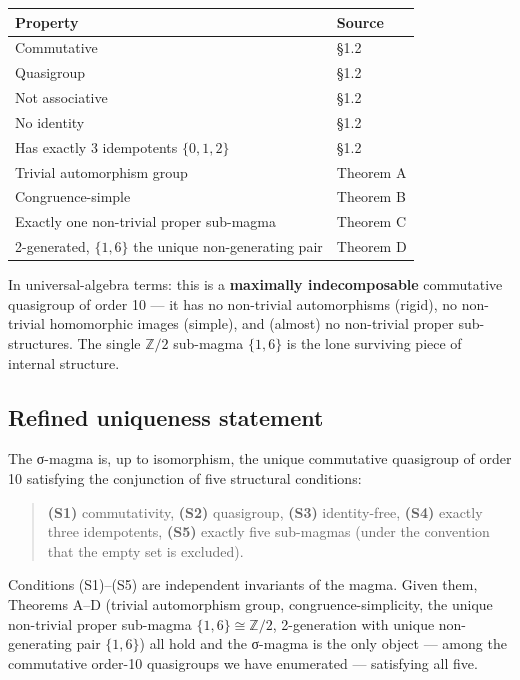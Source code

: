 \documentclass[11pt,reqno]{amsart}
\theoremstyle{plain}
\theoremstyle{definition}
\begin{document}
\begin{center}
\begin{tabular}{ll}
\toprule
Property & Source \\
\midrule
Commutative & §1.2 \\
Quasigroup & §1.2 \\
Not associative & §1.2 \\
No identity & §1.2 \\
Has exactly 3 idempotents $\{0, 1, 2\}$ & §1.2 \\
Trivial automorphism group & Theorem A \\
Congruence-simple & Theorem B \\
Exactly one non-trivial proper sub-magma & Theorem C \\
2-generated, $\{1, 6\}$ the unique non-generating pair & Theorem D \\
\bottomrule
\end{tabular}
\end{center}

In universal-algebra terms: this is a \textbf{maximally indecomposable} commutative quasigroup of order 10 --- it has no non-trivial automorphisms (rigid), no non-trivial homomorphic images (simple), and (almost) no non-trivial proper sub-structures. The single $\mathbb{Z}/2$ sub-magma $\{1, 6\}$ is the lone surviving piece of internal structure.

\subsection{Refined uniqueness statement}

The σ-magma is, up to isomorphism, the unique commutative quasigroup of order 10 satisfying the conjunction of five structural conditions:

\begin{quote}
\textbf{(S1)} commutativity, \textbf{(S2)} quasigroup, \textbf{(S3)} identity-free, \textbf{(S4)} exactly three idempotents, \textbf{(S5)} exactly five sub-magmas (under the convention that the empty set is excluded).
\end{quote}

Conditions (S1)--(S5) are independent invariants of the magma. Given them, Theorems A--D (trivial automorphism group, congruence-simplicity, the unique non-trivial proper sub-magma $\{1, 6\} \cong \mathbb{Z}/2$, 2-generation with unique non-generating pair $\{1, 6\}$) all hold and the σ-magma is the only object --- among the commutative order-10 quasigroups we have enumerated --- satisfying all five.
\end{document}
